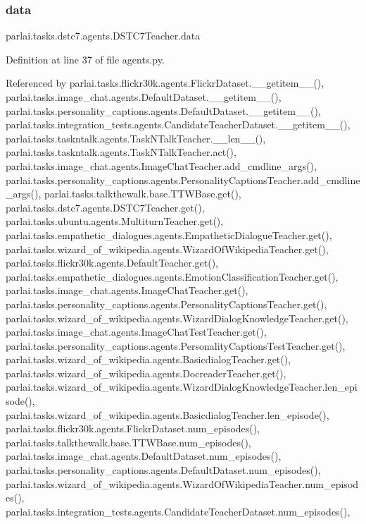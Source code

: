 \subsubsection{\texorpdfstring{data}{data}}
{\footnotesize\ttfamily parlai.\+tasks.\+dstc7.\+agents.\+D\+S\+T\+C7\+Teacher.\+data}



Definition at line 37 of file agents.\+py.



Referenced by parlai.\+tasks.\+flickr30k.\+agents.\+Flickr\+Dataset.\+\_\+\+\_\+getitem\+\_\+\+\_\+(), parlai.\+tasks.\+image\+\_\+chat.\+agents.\+Default\+Dataset.\+\_\+\+\_\+getitem\+\_\+\+\_\+(), parlai.\+tasks.\+personality\+\_\+captions.\+agents.\+Default\+Dataset.\+\_\+\+\_\+getitem\+\_\+\+\_\+(), parlai.\+tasks.\+integration\+\_\+tests.\+agents.\+Candidate\+Teacher\+Dataset.\+\_\+\+\_\+getitem\+\_\+\+\_\+(), parlai.\+tasks.\+taskntalk.\+agents.\+Task\+N\+Talk\+Teacher.\+\_\+\+\_\+len\+\_\+\+\_\+(), parlai.\+tasks.\+taskntalk.\+agents.\+Task\+N\+Talk\+Teacher.\+act(), parlai.\+tasks.\+image\+\_\+chat.\+agents.\+Image\+Chat\+Teacher.\+add\+\_\+cmdline\+\_\+args(), parlai.\+tasks.\+personality\+\_\+captions.\+agents.\+Personality\+Captions\+Teacher.\+add\+\_\+cmdline\+\_\+args(), parlai.\+tasks.\+talkthewalk.\+base.\+T\+T\+W\+Base.\+get(), parlai.\+tasks.\+dstc7.\+agents.\+D\+S\+T\+C7\+Teacher.\+get(), parlai.\+tasks.\+ubuntu.\+agents.\+Multiturn\+Teacher.\+get(), parlai.\+tasks.\+empathetic\+\_\+dialogues.\+agents.\+Empathetic\+Dialogue\+Teacher.\+get(), parlai.\+tasks.\+wizard\+\_\+of\+\_\+wikipedia.\+agents.\+Wizard\+Of\+Wikipedia\+Teacher.\+get(), parlai.\+tasks.\+flickr30k.\+agents.\+Default\+Teacher.\+get(), parlai.\+tasks.\+empathetic\+\_\+dialogues.\+agents.\+Emotion\+Classification\+Teacher.\+get(), parlai.\+tasks.\+image\+\_\+chat.\+agents.\+Image\+Chat\+Teacher.\+get(), parlai.\+tasks.\+personality\+\_\+captions.\+agents.\+Personality\+Captions\+Teacher.\+get(), parlai.\+tasks.\+wizard\+\_\+of\+\_\+wikipedia.\+agents.\+Wizard\+Dialog\+Knowledge\+Teacher.\+get(), parlai.\+tasks.\+image\+\_\+chat.\+agents.\+Image\+Chat\+Test\+Teacher.\+get(), parlai.\+tasks.\+personality\+\_\+captions.\+agents.\+Personality\+Captions\+Test\+Teacher.\+get(), parlai.\+tasks.\+wizard\+\_\+of\+\_\+wikipedia.\+agents.\+Basicdialog\+Teacher.\+get(), parlai.\+tasks.\+wizard\+\_\+of\+\_\+wikipedia.\+agents.\+Docreader\+Teacher.\+get(), parlai.\+tasks.\+wizard\+\_\+of\+\_\+wikipedia.\+agents.\+Wizard\+Dialog\+Knowledge\+Teacher.\+len\+\_\+episode(), parlai.\+tasks.\+wizard\+\_\+of\+\_\+wikipedia.\+agents.\+Basicdialog\+Teacher.\+len\+\_\+episode(), parlai.\+tasks.\+flickr30k.\+agents.\+Flickr\+Dataset.\+num\+\_\+episodes(), parlai.\+tasks.\+talkthewalk.\+base.\+T\+T\+W\+Base.\+num\+\_\+episodes(), parlai.\+tasks.\+image\+\_\+chat.\+agents.\+Default\+Dataset.\+num\+\_\+episodes(), parlai.\+tasks.\+personality\+\_\+captions.\+agents.\+Default\+Dataset.\+num\+\_\+episodes(), parlai.\+tasks.\+wizard\+\_\+of\+\_\+wikipedia.\+agents.\+Wizard\+Of\+Wikipedia\+Teacher.\+num\+\_\+episodes(), parlai.\+tasks.\+integration\+\_\+tests.\+agents.\+Candidate\+Teacher\+Dataset.\+num\+\_\+episodes(), 